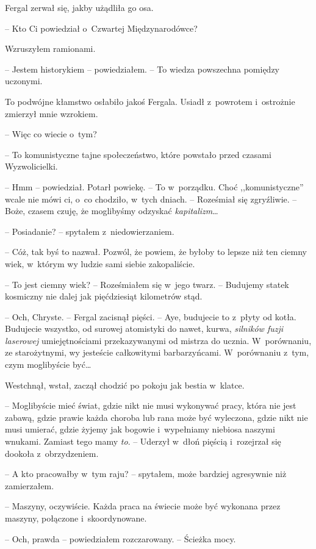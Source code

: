 \documentclass[oneside,polish,11pt,sfheadings]{mwbk}
\begin{document}
Fergal zerwał się, jakby użądliła go osa.

-- Kto Ci powiedział o~Czwartej Międzynarodówce?

Wzruszyłem ramionami. 

-- Jestem historykiem -- powiedziałem. -- To wiedza
powszechna pomiędzy uczonymi.

To podwójne kłamstwo osłabiło jakoś Fergala. Usiadł z~powrotem i~ostrożnie zmierzył mnie wzrokiem.

-- Więc co wiecie o~tym?

-- To komunistyczne tajne społeczeństwo, które powstało przed czasami
Wyzwolicielki.

-- Hmm -- powiedział. Potarł powiekę. -- To w~porządku. Choć
,,komunistyczne'' wcale nie mówi ci, o~co chodziło, w~tych dniach. -- Roześmiał się zgryźliwie. -- Boże, czasem czuję, że moglibyśmy odzyskać
\textit{kapitalizm}\ldots

-- Posiadanie? -- spytałem z~niedowierzaniem.

-- Cóż, tak byś to nazwał. Pozwól, że powiem, że byłoby to lepsze niż ten
ciemny wiek, w~którym wy ludzie sami siebie zakopaliście.

-- To jest ciemny wiek? -- Roześmiałem się w~jego twarz. -- Budujemy statek
kosmiczny nie dalej jak pięćdziesiąt kilometrów stąd.

-- Och, Chryste. -- Fergal zacisnął pięści. -- Aye, budujecie to z~płyty od
kotła. Budujecie wszystko, od surowej atomistyki do nawet, kurwa,
\textit{silników fuzji laserowej }umiejętnościami przekazywanymi od
mistrza do ucznia. W~porównaniu, ze starożytnymi, wy jesteście
całkowitymi barbarzyńcami. W~porównaniu z~tym, czym moglibyście być\ldots

Westchnął, wstał, zaczął chodzić po pokoju jak bestia w~klatce. 

-- Moglibyście mieć świat, gdzie nikt nie musi wykonywać pracy, która nie
jest zabawą, gdzie prawie każda choroba lub rana może być wyleczona,
gdzie nikt nie musi umierać, gdzie żyjemy jak bogowie i~wypełniamy
niebiosa naszymi wnukami. Zamiast tego mamy \textit{to}. -- Uderzył w~dłoń
pięścią i~rozejrzał się dookoła z~obrzydzeniem.

-- A kto pracowałby w~tym raju? -- spytałem, może bardziej agresywnie niż
zamierzałem.

-- Maszyny, oczywiście. Każda praca na świecie może być wykonana przez
maszyny, połączone i~skoordynowane.

-- Och, prawda -- powiedziałem rozczarowany. -- Ścieżka mocy.
\end{document}

